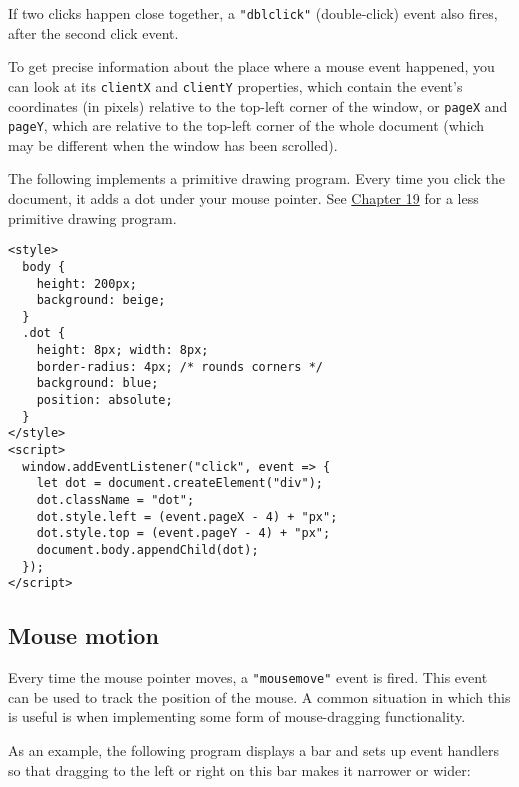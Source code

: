If two clicks happen close together, a \lstinline`"dblclick"` (double-click) event also fires, after the second click event.

To get precise information about the place where a mouse event happened, you can look at its \lstinline`clientX` and \lstinline`clientY` properties, which contain the event's coordinates (in pixels) relative to the top-left corner of the window, or \lstinline`pageX` and \lstinline`pageY`, which are relative to the top-left corner of the whole document (which may be different when the window has been scrolled).

\label{event.mouse_drawing}The following implements a primitive drawing program. Every time you click the document, it adds a dot under your mouse pointer. See \hyperref[paint]{Chapter 19} for a less primitive drawing program.

\begin{lstlisting}
<style>
  body {
    height: 200px;
    background: beige;
  }
  .dot {
    height: 8px; width: 8px;
    border-radius: 4px; /* rounds corners */
    background: blue;
    position: absolute;
  }
</style>
<script>
  window.addEventListener("click", event => {
    let dot = document.createElement("div");
    dot.className = "dot";
    dot.style.left = (event.pageX - 4) + "px";
    dot.style.top = (event.pageY - 4) + "px";
    document.body.appendChild(dot);
  });
</script>
\end{lstlisting}
\noindent

\subsection{Mouse motion}

Every time the mouse pointer moves, a \lstinline`"mousemove"` event is fired. This event can be used to track the position of the mouse. A common situation in which this is useful is when implementing some form of mouse-dragging functionality.

As an example, the following program displays a bar and sets up event handlers so that dragging to the left or right on this bar makes it narrower or wider:

